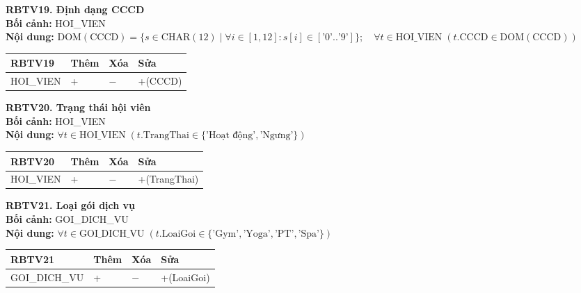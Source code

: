 \documentclass[11pt, a4paper]{article}
\begin{document}
\vspace{0.8em}
\textbf{RBTV19. Định dạng CCCD} \\
\textbf{Bối cảnh:} HOI\_VIEN \\
\textbf{Nội dung:} $\text{DOM}(\text{CCCD}) = \{s \in \text{CHAR}(12) \mid \forall i \in [1, 12]: s[i] \in [\text{'0'}..\text{'9'}]\}; \quad \forall t \in \text{HOI\_VIEN} \; (t.\text{CCCD} \in \text{DOM}(\text{CCCD}))$

\vspace{0.3em}
\begin{small}
\begin{tabularx}{\textwidth}{| C{4.2cm} | C{2cm} | C{2cm} | Y |}
\hline
\textbf{RBTV19} & \textbf{Thêm} & \textbf{Xóa} & \textbf{Sửa} \\
\hline
HOI\_VIEN & + & $-$ & +(CCCD) \\
\hline
\end{tabularx}
\end{small}

\vspace{0.8em}
\textbf{RBTV20. Trạng thái hội viên} \\
\textbf{Bối cảnh:} HOI\_VIEN \\
\textbf{Nội dung:} $\forall t \in \text{HOI\_VIEN} \; (t.\text{TrangThai} \in \{\text{'Hoạt động'}, \text{'Ngưng'}\})$

\vspace{0.3em}
\begin{small}
\begin{tabularx}{\textwidth}{| C{4.2cm} | C{2cm} | C{2cm} | Y |}
\hline
\textbf{RBTV20} & \textbf{Thêm} & \textbf{Xóa} & \textbf{Sửa} \\
\hline
HOI\_VIEN & + & $-$ & +(TrangThai) \\
\hline
\end{tabularx}
\end{small}

\vspace{0.8em}
\textbf{RBTV21. Loại gói dịch vụ} \\
\textbf{Bối cảnh:} GOI\_DICH\_VU \\
\textbf{Nội dung:} $\forall t \in \text{GOI\_DICH\_VU} \; (t.\text{LoaiGoi} \in \{\text{'Gym'}, \text{'Yoga'}, \text{'PT'}, \text{'Spa'}\})$

\vspace{0.3em}
\begin{small}
\begin{tabularx}{\textwidth}{| C{4.2cm} | C{2cm} | C{2cm} | Y |}
\hline
\textbf{RBTV21} & \textbf{Thêm} & \textbf{Xóa} & \textbf{Sửa} \\
\hline
GOI\_DICH\_VU & + & $-$ & +(LoaiGoi) \\
\hline
\end{tabularx}
\end{small}
\end{document}
